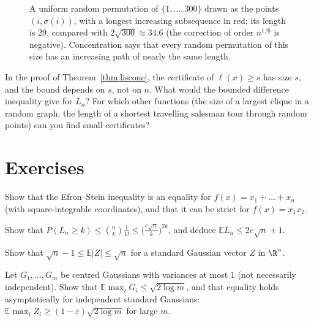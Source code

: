 \begin{figure}[ht]
\centering{}
\caption{A uniform random permutation of $\{1,\dots,300\}$ drawn as the points $(i,\sigma(i))$, with a longest increasing subsequence in red; its length is $29$,
compared with $2\sqrt{300}\approx34.6$ (the correction of order $n^{1/6}$ is negative). Concentration says that every random permutation of this size has an
increasing path of nearly the same length.}
\label{fig:lis}
\end{figure}

\begin{think}
In the proof of Theorem~\ref{thm:lisconc}, the certificate of $\ell(x)\ge s$ has size $s$, and the bound depends on $s$, not on $n$. What would the bounded difference inequality
give for $L_n$? For which other functions (the size of a largest clique in a random graph, the length of a shortest travelling salesman tour through random points) can
you find small certificates?
\end{think}

\section{Exercises}

\begin{exercise}[$\star$]\label{ex:esequality}
Show that the Efron--Stein inequality is an equality for $f(x)=x_1+\dots+x_n$ (with square-integrable coordinates), and that it can be strict for $f(x)=x_1x_2$.
\end{exercise}

\begin{exercise}[$\star$]\label{ex:lismean}
Show that $P(L_n\ge k)\le\binom nk\frac1{k!}\le\bigl(\frac{e\sqrt n}k\bigr)^{2k}$, and deduce $\mathbb EL_n\le2e\sqrt n+1$.
\end{exercise}

\begin{exercise}[$\star$]\label{ex:thinshellmean}
Show that $\sqrt n-1\le\mathbb E|Z|\le\sqrt n$ for a standard Gaussian vector $Z$ in $\R^n$.
\end{exercise}

\begin{exercise}[$\star\star$]\label{ex:maxmean}
Let $G_1,\dots,G_m$ be centred Gaussians with variances at most $1$ (not necessarily independent). Show that $\mathbb E\max_iG_i\le\sqrt{2\log m}$, and that equality holds asymptotically
for independent standard Gaussians: $\mathbb E\max_iZ_i\ge(1-\varepsilon)\sqrt{2\log m}$ for large $m$.
\end{exercise}

